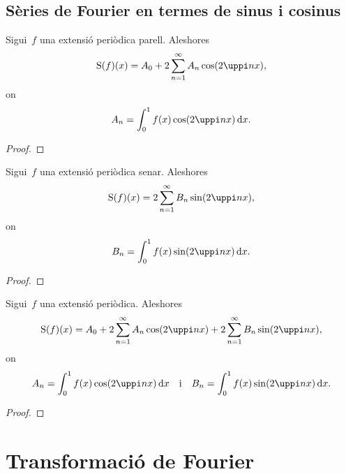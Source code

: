 \documentclass[../../Main.tex]{subfiles}
\begin{document}
	\subsection{Sèries de Fourier en termes de sinus i cosinus}
	\begin{proposition}
		\label{prop:sèrie de Fourier d'una funció parell}
		Sigui~\(f\) una extensió periòdica parell.
		Aleshores
		\[
		    \sfourier(f)(x)=A_{0}+2\sum_{n=1}^{\infty}A_{n}\cos(2\uppi nx),
		\]
		on
		\[
		    A_{n}=\int_{0}^{1}f(x)\cos(2\uppi nx)\diff x.
		\] %
		\begin{proof}
		\end{proof}
	\end{proposition}
	\begin{proposition}
		\label{prop:sèrie de Fourier d'una funció senar}
		Sigui~\(f\) una extensió periòdica senar.
		Aleshores
		\[
		    \sfourier(f)(x)=2\sum_{n=1}^{\infty}B_{n}\sin(2\uppi nx),
		\]
		on
		\[
		    B_{n}=\int_{0}^{1}f(x)\sin(2\uppi nx)\diff x.
		\]
		\begin{proof}
		\end{proof}
	\end{proposition}
	\begin{theorem}
		Sigui~\(f\) una extensió periòdica.
		Aleshores
		\[
		    \sfourier(f)(x)=A_{0}+2\sum_{n=1}^{\infty}A_{n}\cos(2\uppi nx)+2\sum_{n=1}^{\infty}B_{n}\sin(2\uppi nx),
		\]
		on
		\[
		    A_{n}=\int_{0}^{1}f(x)\cos(2\uppi nx)\diff x\quad\text{i}\quad B_{n}=\int_{0}^{1}f(x)\sin(2\uppi nx)\diff x.
		\]
		\begin{proof}
		\end{proof}
	\end{theorem}
\section{Transformació de Fourier}
\end{document}
